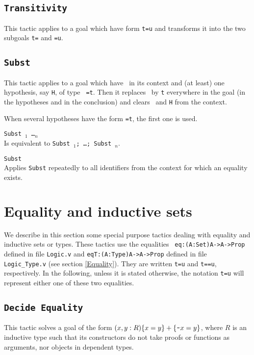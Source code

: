 \subsection{\tt Transitivity \term}
This tactic applies to a goal which have form {\tt t=u}
and transforms it into the two subgoals 
{\tt t={\term}} and {\tt {\term}=u}.

\subsection{\tt Subst {\ident}}
This tactic applies to a goal which have \ident\ in its context and
(at least) one hypothesis, say {\tt H}, of type {\tt
  \ident=t}. Then it replaces 
\ident\ by {\tt t} everywhere in the goal (in the hypotheses 
and in the conclusion) and clears \ident\ and {\tt H} from the context.

\Rem 
When several hypotheses have the form {\tt \ident=t}, the first one is used.

\begin{Variants}
  \item {\tt Subst \ident$_1$ \dots \ident$_n$} \\
    Is equivalent to {\tt Subst \ident$_1$; \dots; Subst \ident$_n$}.
  \item {\tt Subst} \\
    Applies {\tt Subst} repeatedly to all identifiers from the context
    for which an equality exists.
\end{Variants}


\section{Equality and inductive sets}
We describe in this section some special purpose
tactics dealing with equality and inductive sets or
types.  These tactics use the equalities {\tt
eq:(A:Set)A->A->Prop} defined in file {\tt Logic.v}
and {\tt eqT:(A:Type)A->A->Prop} defined in file
{\tt Logic\_Type.v} (see section \ref{Equality}).
They are written {\tt t=u} and {\tt t==u},
respectively. In the following, unless it is stated
otherwise, the notation {\tt t=u} will represent
either one of these two equalities.

\subsection{\tt Decide Equality}
\label{DecideEquality}
This tactic solves a goal of the form
$(x,y:R)\{x=y\}+\{\verb|~|x=y\}$, where $R$ is an inductive type
such that its constructors do not take proofs or functions as
arguments, nor objects in dependent types.

